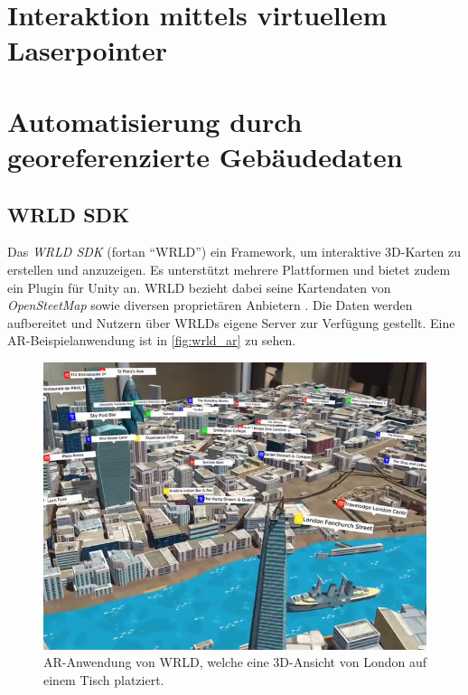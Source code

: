 \section{Interaktion mittels virtuellem Laserpointer}

\section{Automatisierung durch georeferenzierte Gebäudedaten}
\label{sec:building_data_automation}

\subsection{WRLD SDK}

Das \emph{WRLD SDK} (fortan \enquote{WRLD}) ein Framework, um interaktive 3D-Karten zu erstellen und anzuzeigen.
Es unterstützt mehrere Plattformen und bietet zudem ein Plugin für Unity an.
WRLD bezieht dabei seine Kartendaten von \emph{OpenSteetMap} sowie diversen proprietären Anbietern \parencite{WRLD2018}.
Die Daten werden aufbereitet und Nutzern über WRLDs eigene Server zur Verfügung gestellt.
Eine AR-Beispielanwendung ist in \autoref{fig:wrld_ar} zu sehen.
\begin{figure}
    \centering
    \includegraphics[width=\textwidth]{figures/wrld_ar-web-11}
    \caption{AR-Anwendung von WRLD, welche eine 3D-Ansicht von London auf einem Tisch platziert. }
    \label{fig:wrld_ar}
\end{figure}

